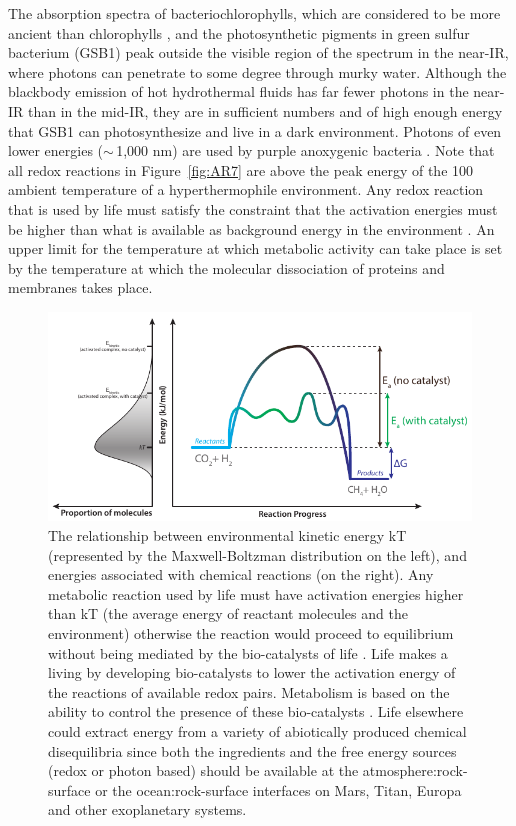 The absorption spectra of bacteriochlorophylls, which are considered to be more ancient than chlorophylls \citep{Hohmann-marriott2011,Blankenship2010}, and the photosynthetic pigments in green sulfur bacterium (GSB1) peak outside the visible region of the spectrum in the near-IR, where photons can penetrate to some degree through murky water. Although the blackbody emission of hot hydrothermal fluids has far fewer photons in the near-IR than in the mid-IR, they are in sufficient numbers and of high enough energy that GSB1 can photosynthesize and live in a dark environment. Photons of even lower energies ($\sim$\,1,000 nm) are used by purple anoxygenic bacteria \citep{Kiang2007}. Note that all redox reactions in Figure~\ref{fig:AR7} are above the peak energy of the 100\textcelsius{} ambient temperature of a hyperthermophile environment. Any redox reaction that is used by life must satisfy the constraint that the activation energies must be higher than what is available as background energy in the environment \citep{Shock2007}. An upper limit for the temperature at which metabolic activity can take place is set by the temperature at which the molecular dissociation of proteins and membranes takes place.

\begin{figure}[!hbt]
	\centering
	\includegraphics[width=1\linewidth]{figures/Reactions.pdf}
	\caption[Thermodynamics of energy sources for life]{The relationship between environmental kinetic energy kT (represented by the Maxwell-Boltzman distribution on the left), and energies associated with chemical reactions (on the right). Any metabolic reaction used by life must have activation energies higher than kT (the average energy of reactant molecules and the environment) otherwise the reaction would proceed to equilibrium without being mediated by the bio-catalysts of life \citet{Shock2007}. Life makes a living by developing bio-catalysts to lower the activation energy of the reactions of available redox pairs. Metabolism is based on the ability to control the presence of these bio-catalysts \citet{Nealson1999}. Life elsewhere could extract energy from a variety of abiotically produced chemical disequilibria since both the ingredients and the free energy sources (redox or photon based) should be available at the atmosphere:rock-surface or the ocean:rock-surface interfaces on Mars, Titan, Europa and other exoplanetary systems.}
	\label{fig:Reactions}
\end{figure}


